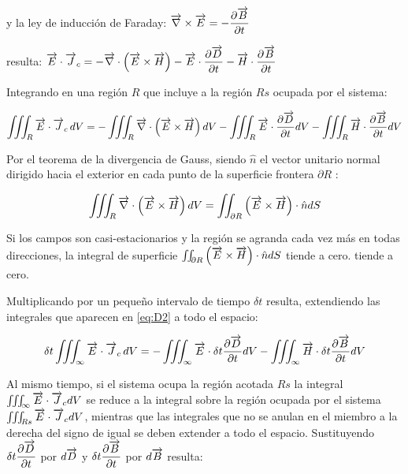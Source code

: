 y la ley de inducción de Faraday: $\overrightarrow{\nabla}\times\overrightarrow{E}=-\dfrac{\partial \overrightarrow{B}}{\partial t}$ 

resulta: $\overrightarrow{E}\cdot\overrightarrow{J}_{c} = -\overrightarrow{\nabla}\cdot \left( \overrightarrow{E}\times\overrightarrow{H} \right) -\overrightarrow{E} \cdot \dfrac{\partial \overrightarrow{D}}{\partial t} -\overrightarrow{H} \cdot \dfrac{\partial \overrightarrow{B}}{\partial t} $

Integrando en una región $R$ que incluye a la región $Rs$ ocupada por el sistema:

\begin{equation}
	\label{eq:D2}
	\iiint_{R}\overrightarrow{E}\cdot\overrightarrow{J}_{c}\,dV = -\iiint_{R}\overrightarrow{\nabla}\cdot \left( \overrightarrow{E}\times\overrightarrow{H} \right)dV -\iiint_{R}\overrightarrow{E} \cdot \dfrac{\partial \overrightarrow{D}}{\partial t}dV -\iiint_{R}\overrightarrow{H} \cdot \dfrac{\partial \overrightarrow{B}}{\partial t}dV
\end{equation}

Por el teorema de la divergencia de Gauss, siendo $\hat{n}$ el vector unitario normal dirigido hacia el exterior en cada punto de la superficie frontera $\partial R$ \citep{Santalo1}:

\begin{equation*}
	\iiint_{R}\overrightarrow{\nabla}\cdot \left( \overrightarrow{E}\times\overrightarrow{H} \right)dV =\iint_{\partial R} \left( \overrightarrow{E}\times\overrightarrow{H} \right) \cdot \hat{n} dS
\end{equation*}

\begin{sloppypar}
Si los campos son casi-estacionarios y la región se agranda cada vez más en todas direcciones, la integral de superficie ${\iint_{\partial R} \left( \overrightarrow{E}\times\overrightarrow{H} \right) \cdot \hat{n} dS}$ tiende a cero.
 tiende a cero.
\end{sloppypar} 
 
 
Multiplicando por un pequeño intervalo de tiempo $\delta t$ resulta, extendiendo las integrales que aparecen en \ref{eq:D2} a todo el espacio:

\begin{equation}
	\label{eq:D3}
	\delta t \iiint_{\infty}\overrightarrow{E}\cdot\overrightarrow{J}_{c}\,dV = -\iiint_{\infty}\overrightarrow{E} \cdot \delta t \dfrac{\partial \overrightarrow{D}}{\partial t}dV -\iiint_{\infty}\overrightarrow{H} \cdot \delta t \dfrac{\partial \overrightarrow{B}}{\partial t}dV
\end{equation}

\begin{sloppypar}
Al mismo tiempo, si el sistema ocupa la región acotada $Rs$ la integral ${\iiint_{\infty}\overrightarrow{E}\cdot\overrightarrow{J}_{c}dV}$ se reduce a la integral sobre la región ocupada por el sistema ${\iiint_{Rs}\overrightarrow{E}\cdot\overrightarrow{J}_{c}dV}$, mientras que
las integrales que no se anulan en el miembro a la derecha del signo de igual se deben extender a todo el espacio. Sustituyendo ${\delta t \dfrac{\partial \overrightarrow{D}}{\partial t}}$ por $d\overrightarrow{D}$ y ${\delta t \dfrac{\partial \overrightarrow{B}}{\partial t}}$ por $d\overrightarrow{B}$ resulta:
\end{sloppypar}

